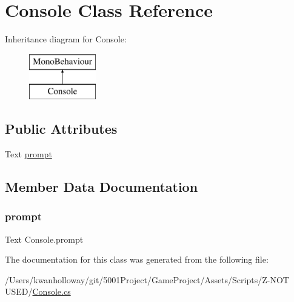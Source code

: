 \hypertarget{class_console}{}\section{Console Class Reference}
\label{class_console}
Inheritance diagram for Console\+:\begin{figure}[H]
\begin{center}
\leavevmode
\includegraphics[height=2.000000cm]{class_console}
\end{center}
\end{figure}
\subsection*{Public Attributes}
\begin{DoxyCompactItemize}
\item 
Text \hyperlink{class_console_a6c5f3d4931901e23af8266ca936c7c88}{prompt}
\end{DoxyCompactItemize}


\subsection{Member Data Documentation}
\mbox{\label{class_console_a6c5f3d4931901e23af8266ca936c7c88}} 
\subsubsection{\texorpdfstring{prompt}{prompt}}
{\footnotesize\ttfamily Text Console.\+prompt}



The documentation for this class was generated from the following file\+:\begin{DoxyCompactItemize}
\item 
/\+Users/kwanholloway/git/5001\+Project/\+Game\+Project/\+Assets/\+Scripts/\+Z-\/\+N\+O\+T U\+S\+E\+D/\hyperlink{_console_8cs}{Console.\+cs}\end{DoxyCompactItemize}

